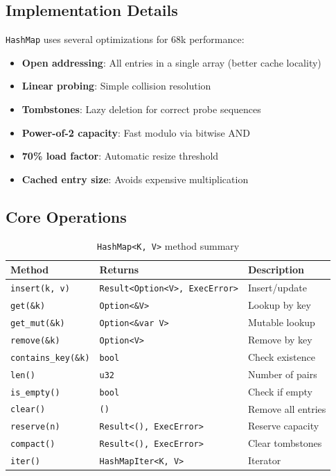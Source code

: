 \subsection{Implementation Details}

\texttt{HashMap} uses several optimizations for 68k performance:

\begin{itemize}
    \item \textbf{Open addressing}: All entries in a single array (better cache locality)
    \item \textbf{Linear probing}: Simple collision resolution
    \item \textbf{Tombstones}: Lazy deletion for correct probe sequences
    \item \textbf{Power-of-2 capacity}: Fast modulo via bitwise AND
    \item \textbf{70\% load factor}: Automatic resize threshold
    \item \textbf{Cached entry size}: Avoids expensive multiplication
\end{itemize}

\subsection{Core Operations}

\begin{table}[h]
\centering
\begin{tabular}{lll}
\textbf{Method} & \textbf{Returns} & \textbf{Description} \\
\hline
\texttt{insert(k, v)} & \texttt{Result<Option<V>, ExecError>} & Insert/update \\
\texttt{get(\&k)} & \texttt{Option<\&V>} & Lookup by key \\
\texttt{get\_mut(\&k)} & \texttt{Option<\&var V>} & Mutable lookup \\
\texttt{remove(\&k)} & \texttt{Option<V>} & Remove by key \\
\texttt{contains\_key(\&k)} & \texttt{bool} & Check existence \\
\texttt{len()} & \texttt{u32} & Number of pairs \\
\texttt{is\_empty()} & \texttt{bool} & Check if empty \\
\texttt{clear()} & \texttt{()} & Remove all entries \\
\texttt{reserve(n)} & \texttt{Result<(), ExecError>} & Reserve capacity \\
\texttt{compact()} & \texttt{Result<(), ExecError>} & Clear tombstones \\
\texttt{iter()} & \texttt{HashMapIter<K, V>} & Iterator \\
\end{tabular}
\caption{\texttt{HashMap<K, V>} method summary}
\end{table}

